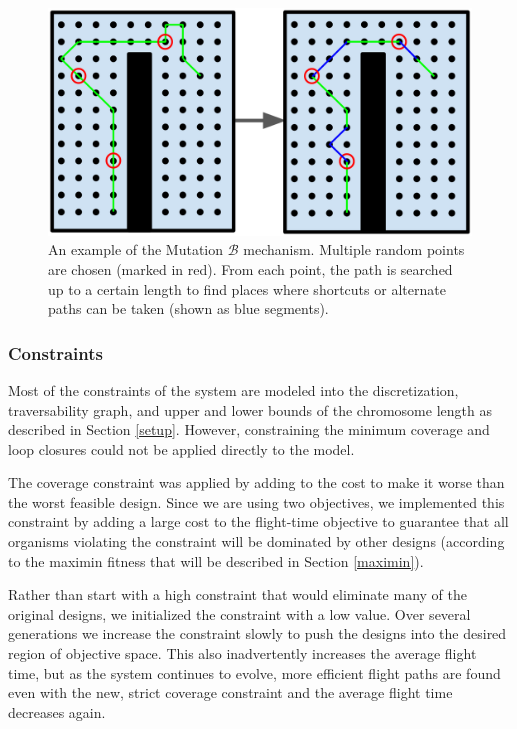 \documentclass[letterpaper, 10 pt, conference]{ieeeconf}  %
\begin{document}
\begin{figure}
\centering
\includegraphics[width=1.0\linewidth]{muterpolation.png}
\caption[An example of the coverage planner Mutation $\mathcal{B}$ mechanism]{An example of the Mutation $\mathcal{B}$ mechanism. Multiple random points are chosen (marked in red). From each point, the path is searched up to a certain length to find places where shortcuts or alternate paths can be taken (shown as blue segments).}
\label{fig:muterpolation}
\end{figure}

\subsubsection{Constraints}\label{constraints}

Most of the constraints of the system are modeled into the discretization, traversability graph, and upper and lower bounds of the chromosome length as described in Section \ref{setup}. However, constraining the minimum coverage and loop closures could not be applied directly to the model.

The coverage constraint was applied by adding to the cost to make it worse than the worst feasible design. Since we are using two objectives, we implemented this constraint by adding a large cost to the flight-time objective to guarantee that all organisms violating the constraint will be dominated by other designs (according to the maximin fitness that will be described in Section \ref{maximin}).

Rather than start with a high constraint that would eliminate many of the original designs, we initialized the constraint with a low value. Over several generations we increase the constraint slowly to push the designs into the desired region of objective space. This also inadvertently increases the average flight time, but as the system continues to evolve, more efficient flight paths are found even with the new, strict coverage constraint and the average flight time decreases again.
\end{document}
